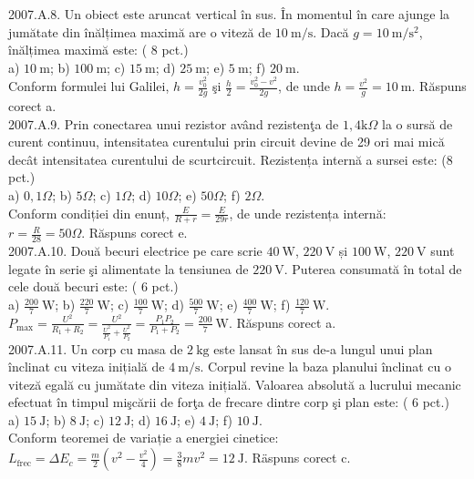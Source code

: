 2007.A.8. Un obiect este aruncat vertical în sus. În momentul în care ajunge la jumătate din înălțimea maximă are o viteză de $10 \mathrm{~m} / \mathrm{s}$. Dacă $g=10 \mathrm{~m} / \mathrm{s}^{2}$, înălțimea maximă este: ( 8 pct.)\\ a) $10 \mathrm{~m}$; b) $100 \mathrm{~m}$; c) $15 \mathrm{~m}$; d) $25 \mathrm{~m}$; e) $5 \mathrm{~m}$; f) $20 \mathrm{~m}$.\\ Conform formulei lui Galilei, $h=\frac{v_{0}^{2}}{2 g}$ şi $\frac{h}{2}=\frac{v_{0}^{2}-v^{2}}{2 g}$, de unde $h=\frac{v^{2}}{g}=10 \mathrm{~m}$. Răspuns corect a.\\

2007.A.9. Prin conectarea unui rezistor având rezistenţa de $1,4 \mathrm{k} \Omega$ la o sursă de curent continuu, intensitatea curentului prin circuit devine de 29 ori mai mică decât intensitatea curentului de scurtcircuit. Rezistența internă a sursei este: (8 pct.)\\ a) $0,1 \Omega$; b) $5 \Omega$; c) $1 \Omega$; d) $10 \Omega$; e) $50 \Omega$; f) $2 \Omega$.\\ Conform condiției din enunț, $\frac{E}{R+r}=\frac{E}{29 r}$, de unde rezistența internă:\\ $r=\frac{R}{28}=50 \Omega$. Răspuns corect e.\\

2007.A.10. Două becuri electrice pe care scrie $40 \mathrm{~W}$, $220 \mathrm{~V}$ și $100 \mathrm{~W}$, $220 \mathrm{~V}$ sunt legate în serie şi alimentate la tensiunea de $220 \mathrm{~V}$. Puterea consumată în total de cele două becuri este: ( 6 pct.)\\ a) $\frac{200}{7} \mathrm{~W}$; b) $\frac{220}{7} \mathrm{~W}$; c) $\frac{100}{7} \mathrm{~W}$; d) $\frac{500}{7} \mathrm{~W}$; e) $\frac{400}{7} \mathrm{~W}$; f) $\frac{120}{7} \mathrm{~W}$.\\ $P_{\max}=\frac{U^{2}}{R_{1}+R_{2}}=\frac{U^{2}}{\frac{U^{2}}{P_{1}}+\frac{U^{2}}{P_{2}}}=\frac{P_{1} P_{2}}{P_{1}+P_{2}}=\frac{200}{7} \mathrm{~W}$. Răspuns corect a.\\

2007.A.11. Un corp cu masa de $2 \mathrm{~kg}$ este lansat în sus de-a lungul unui plan înclinat cu viteza inițială de $4 \mathrm{~m} / \mathrm{s}$. Corpul revine la baza planului înclinat cu o viteză egală cu jumătate din viteza inițială. Valoarea absolută a lucrului mecanic efectuat în timpul mişcării de forţa de frecare dintre corp şi plan este: ( 6 pct.)\\ a) $15 \mathrm{~J}$; b) $8 \mathrm{~J}$; c) $12 \mathrm{~J}$; d) $16 \mathrm{~J}$; e) $4 \mathrm{~J}$; f) $10 \mathrm{~J}$.\\ Conform teoremei de variație a energiei cinetice:\\ $L_{\text {frec}}=\Delta E_{c}=\frac{m}{2}\left(v^{2}-\frac{v^{2}}{4}\right)=\frac{3}{8} m v^{2}=12 \mathrm{~J}$. Räspuns corect c.\\

